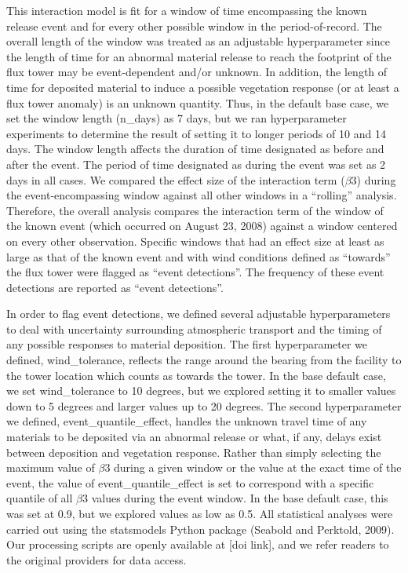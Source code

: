 \documentclass{article}
\begin{document}
This interaction model is fit for a window of time encompassing the known release event and for every other possible window in the period-of-record. The overall length of the window was treated as an adjustable hyperparameter since the length of time for an abnormal material release to reach the footprint of the flux tower may be event-dependent and/or unknown. In addition, the length of time for deposited material to induce a possible vegetation response (or at least a flux tower anomaly) is an unknown quantity. Thus, in the default base case, we set the window length (n\_days) as 7 days, but we ran hyperparameter experiments to determine the result of setting it to longer periods of 10 and 14 days. The window length affects the duration of time designated as before and after the event. The period of time designated as during the event was set as 2 days in all cases. We compared the effect size of the interaction term ($\beta$3) during the event-encompassing window against all other windows in a “rolling” analysis. Therefore, the overall analysis compares the interaction term of the window of the known event (which occurred on August 23, 2008) against a window centered on every other observation. Specific windows that had an effect size at least as large as that of the known event and with wind conditions defined as “towards” the flux tower were flagged as “event detections”. The frequency of these event detections are reported as “event detections”. 

In order to flag event detections, we defined several adjustable hyperparameters to deal with uncertainty surrounding atmospheric transport and the timing of any possible responses to material deposition. The first hyperparameter we defined, wind\_tolerance, reflects the range around the bearing from the facility to the tower location which counts as towards the tower. In the base default case, we set wind\_tolerance to 10 degrees, but we explored setting it to smaller values down to 5 degrees and larger values up to 20 degrees. The second hyperparameter we defined, event\_quantile\_effect, handles the unknown travel time of any materials to be deposited via an abnormal release or what, if any, delays exist between deposition and vegetation response. Rather than simply selecting the maximum value of $\beta$3 during a given window or the value at the exact time of the event, the value of event\_quantile\_effect is set to correspond with a specific quantile of all $\beta$3 values during the event window. In the base default case, this was set at 0.9, but we explored values as low as 0.5. All statistical analyses were carried out using the statsmodels Python package (Seabold and Perktold, 2009). Our processing scripts are openly available at [doi link], and we refer readers to the original providers for data access.
\end{document}
